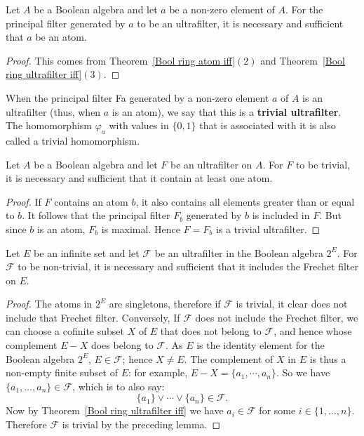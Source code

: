 \begin{theorem}
Let $A$ be a Boolean algebra and let $a$ be a non-zero element of $A$. For the principal filter generated by $a$ to 
be an ultrafilter, it is necessary and sufficient that $a$ be an atom.
\end{theorem}
\begin{proof}
This comes from Theorem~\ref{Bool ring atom iff}$(2)$ and Theorem~\ref{Bool ring ultrafilter iff}$(3)$.
\end{proof}
When the principal filter Fa generated by a non-zero element $a$ of $A$ is an ultrafilter (thus, when $a$ is an atom), we 
say that this is a \textbf{trivial ultrafilter}. The homomorphism $\varphi_a$ with values in $\{0,1\}$ that is associated with it is also called a trivial homomorphism.
\begin{lemma}
Let $A$ be a Boolean algebra and let $F$ be an ultrafilter on $A$. For $F$ to be trivial, it is necessary and sufficient that it contain at least one atom.
\end{lemma}
\begin{proof}
If $F$ contains an atom $b$, it also contains all elements greater than or equal to $b$. It follows that the principal filter $F_b$ generated by $b$ is included in $F$. 
But since $b$ is an atom, $F_b$ is maximal. Hence $F=F_b$ is a trivial ultrafilter.
\end{proof}
\begin{theorem}
Let $E$ be an infinite set and let $\mathcal{F}$ be an ultrafilter in the Boolean algebra $2^E$. For $\mathcal{F}$ to be non-trivial, it is necessary and sufficient that it includes the Frechet filter on $E$.
\end{theorem}
\begin{proof}
The atoms in $2^E$ are singletons, therefore if $\mathcal{F}$ is trivial, it clear does not include that Frechet filter. Conversely, If $\mathcal{F}$ does not include the Frechet filter, 
we can choose a cofinite subset $X$ of $E$ that does not belong to $\mathcal{F}$, and hence whose complement $E-X$ does belong to $\mathcal{F}$. As $E$ is the identity element for the Boolean 
algebra $2^E$, $E\in\mathcal{F}$; hence $X\neq E$. The complement of $X$ in $E$ is thus a non-empty finite subset of $E$: for example, $E-X=\{a_1,\cdots,a_n\}$. So we have 
$\{a_1,\dots,a_n\}\in\mathcal{F}$, which is to also say:
\[\{a_1\}\vee\cdots\vee\{a_n\}\in\mathcal{F}.\]
Now by Theorem~\ref{Bool ring ultrafilter iff} we have $a_i\in\mathcal{F}$ for some $i\in\{1,\dots,n\}$. Therefore $\mathcal{F}$ is trivial by the preceding lemma.
\end{proof}

